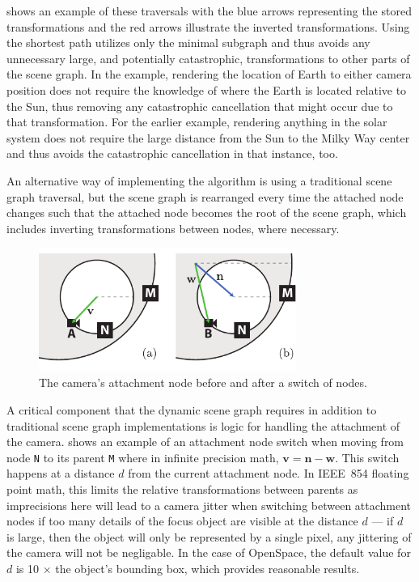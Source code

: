  shows an example of these traversals with the blue arrows representing the stored transformations and the red arrows illustrate the inverted transformations.  Using the shortest path utilizes only the minimal subgraph and thus avoids any unnecessary large, and potentially catastrophic, transformations to other parts of the scene graph.  In the example, rendering the location of Earth to either camera position does not require the knowledge of where the Earth is located relative to the Sun, thus removing any catastrophic cancellation that might occur due to that transformation.  For the earlier example, rendering anything in the solar system does not require the large distance from the Sun to the Milky Way center and thus avoids the catastrophic cancellation in that instance, too.

An alternative way of implementing the algorithm is using a traditional scene graph traversal, but the scene graph is rearranged every time the attached node changes such that the attached node becomes the root of the scene graph, which includes inverting transformations between nodes, where necessary.

\begin{figure}
\centering
\includegraphics[width=0.75\textwidth]{figures/contributions/dsg/attachment-switch.pdf}
\caption{The camera's attachment node before and after a switch of nodes.}
\label{contributions:astro:dsg:switch}
\end{figure}

A critical component that the dynamic scene graph requires in addition to traditional scene graph implementations is logic for handling the attachment of the camera.   shows an example of an attachment node switch when moving from node \texttt{N} to its parent \texttt{M} where in infinite precision math, $\textbf{v} = \textbf{n}-\textbf{w}$.  This switch happens at a distance $d$ from the current attachment node.  In IEEE~854 floating point math, this limits the relative transformations between parents as imprecisions here will lead to a camera jitter when switching between attachment nodes if too many details of the focus object are visible at the distance $d$ --- if $d$ is large, then the object will only be represented by a single pixel, any jittering of the camera will not be negligable.  In the case of OpenSpace, the default value for $d$ is 10 $\times$ the object's bounding box, which provides reasonable results.

